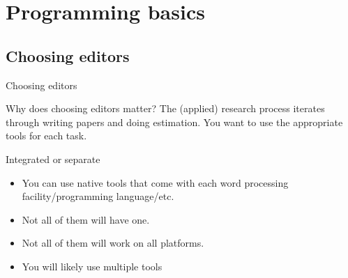 \documentclass[xcolor=table,compress]{beamer}
\begin{document}
\section[Basics]{Programming basics}
\subsection[Editors]{Choosing editors}

\begin{frame}{Choosing editors}
\begin{block}{Why does choosing editors matter?}
The (applied) research process iterates through writing papers and doing estimation. You want to use the appropriate tools for each task.
\end{block}
\begin{block}{Integrated or separate}
\begin{itemize}
\item You can use native tools that come with each word processing facility/programming language/etc. 
\item Not all of them will have one. 
\item Not all of them will work on all platforms.
\item You will likely use multiple tools
\end{itemize}
\end{block}
\end{frame}
\end{document}
